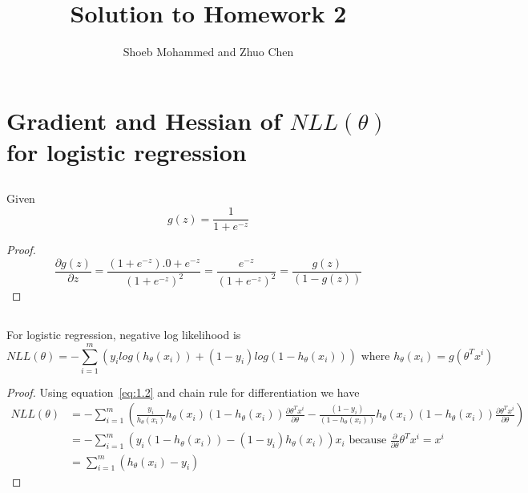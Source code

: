 \documentclass{article}
\begin{document}
\title{Solution to Homework 2}
\author{Shoeb Mohammed and Zhuo Chen}
\maketitle

\newcommand{\QEDA}{\hfill\ensuremath{\blacksquare}}
\newcommand{\QEDB}{\hfill\ensuremath{\square}}

\section{Gradient and Hessian of $NLL(\theta)$ for logistic regression}
\subsection{}
Given
\begin{equation}
  \label{eq:1.1}
  g(z) = \frac{1}{1+e^{-z}}
\end{equation}

\begin{proof}
\begin{equation}
  \label{eq:1.2}
  \frac{\partial g(z)}{\partial z} = \frac{(1+e^{-z}).0 + e^{-z}}{(1+e^{-z})^2} = \frac{e^{-z}}{(1+e^{-z})^2} = \frac{g(z)}{(1-g(z))}
\end{equation}
\end{proof}
\subsection{}

\newcommand{\HthetaXi}{h_\theta(x_i)}

For logistic regression, negative log likelihood is
\begin{equation}
  \label{eq:1.3}
  NLL(\theta)  = - \sum_{i=1}^{m} \left( y_i log(\HthetaXi) + (1-y_i)log(1-\HthetaXi) \right) \text{ where } \HthetaXi = g(\theta^Tx^i)
\end{equation}

\begin{proof}
Using equation~\ref{eq:1.2} and chain rule for differentiation we have
\begin{equation}
  \label{eq:1.4}
  \begin{split}
  NLL(\theta)  &= - \sum_{i=1}^{m} \left( \frac{y_i}{\HthetaXi}\HthetaXi(1-\HthetaXi)\frac{\partial \theta^T x^i}{\partial \theta} 
                                         - \frac{(1-y_i)}{(1-\HthetaXi)}\HthetaXi(1-\HthetaXi)\frac{\partial \theta^T x^i}{\partial \theta} \right) \\
               &= - \sum_{i=1}^{m} \left( y_i(1-\HthetaXi) - (1-y_i)\HthetaXi\right) x_i \text{ because } \frac{\partial}{\partial \theta} \theta^T x^i = x^i \\
               &=   \sum_{i=1}^{m} \left(\HthetaXi - y_i\right)
  \end{split}
\end{equation}
\end{proof}
\end{document}
